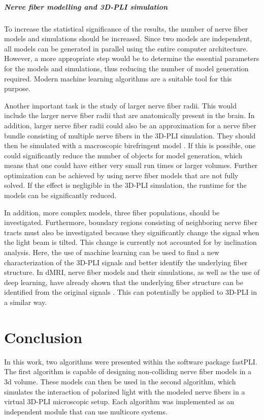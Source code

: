 \paragraph{Nerve fiber modelling and \ac{3D-PLI} simulation}
% 
To increase the statistical significance of the results, the number of nerve fiber models and simulations should be increased.
Since two models are independent, all models can be generated in parallel using the entire computer architecture.
However, a more appropriate step would be to determine the essential parameters for the models and simulations, thus reducing the number of model generation required.
Modern machine learning algorithms are a suitable tool for this purpose.
\par
% 
Another important task is the study of larger nerve fiber radii.
This would include the larger nerve fiber radii that are anatomically present in the brain.
In addition, larger nerve fiber radii could also be an approximation for a nerve fiber bundle consisting of multiple nerve fibers in the \ac{3D-PLI} simulation.
They should then be simulated with a macroscopic birefringent model \cite{Menzel2015}.
If this is possible, one could significantly reduce the number of objects for model generation, which means that one could have either very small run times or larger volumes.
Further optimization can be achieved by using nerve fiber models that are not fully solved.
If the effect is negligible in the \ac{3D-PLI} simulation, the runtime for the models can be significantly reduced.
\par
% 
In addition, more complex models, \eg{} three fiber populations, should be investigated.
Furthermore, boundary regions consisting of neighboring nerve fiber tracts must also be investigated because they significantly change the signal when the light beam is tilted.
This change is currently not accounted for by inclination analysis.
Here, the use of machine learning can be used to find a new characterization of the \ac{3D-PLI} signals and better identify the underlying fiber structure.
In \ac{dMRI}, nerve fiber models and their simulations, as well as the use of deep learning, have already shown that the underlying fiber structure can be identified from the original signals \cite{ginsburgerDis2019}.
This can potentially be applied to \ac{3D-PLI} in a similar way.
% 
% 
% 
% 
% 
\chapter{Conclusion}
\label{sec:conclusion}
% 
In this work, two algorithms were presented within the software package \ac{fastPLI}.
The first algorithm is capable of designing non-colliding nerve fiber models in a 3d volume.
These models can then be used in the second algorithm, which simulates the interaction of polarized light with the modeled nerve fibers in a virtual \ac{3D-PLI} microscopic setup.
Each algorithm was implemented as an independent \python{} module that can use multicore systems.
% 
% 
% 
